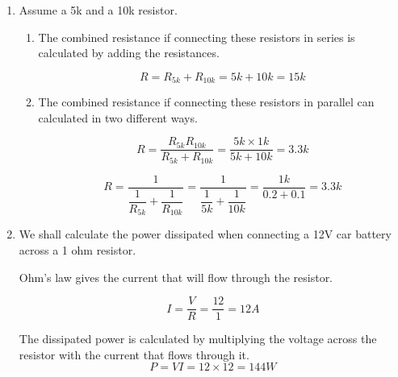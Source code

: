 \documentclass[]{article}
\begin{document}
\begin{enumerate}
	
	\item Assume a 5k and a 10k resistor.
	
	\begin{enumerate}
		
		\item The combined resistance if connecting these resistors in series is calculated by adding the resistances.
		
		\begin{equation*}
		R = R_{5k} + R_{10k} = 5k + 10k = 15k
		\end{equation*}
		
		\item The combined resistance if connecting these resistors in parallel can calculated in two different ways.
		
		\begin{equation*}
				R = \dfrac{ R_{5k} R_{10k} }{ R_{5k} + R_{10k} } = \dfrac{ 5k \times 1k }{ 5k + 10k } = 3.3k
		\end{equation*}
		
		\begin{equation*}
			R = \dfrac{ 1 }{ \dfrac{ 1 }{ R_{5k} } + \dfrac { 1 } { R_{10k} } }
			= \dfrac{ 1 }{ \dfrac{ 1 }{ 5k } + \dfrac { 1 } { 10k } } 
			= \dfrac {1k}{0.2 + 0.1}= 3.3k
		\end{equation*}
		
	\end{enumerate}
		
	\item We shall calculate the power dissipated when connecting a 12V car battery across a 1 ohm resistor.
		
	Ohm's law gives the current that will flow through the resistor.
		
	\begin{equation*}
		I =\dfrac{ V }{ R } = \dfrac{ 12 }{ 1 } = 12A
	\end{equation*}
	
	The dissipated power is calculated by multiplying the voltage across the resistor with the current that flows through it.
	\begin{equation*}
		P = VI = 12 \times 12 = 144W
	\end{equation*}
		
\end{enumerate}
	
\end{document}
